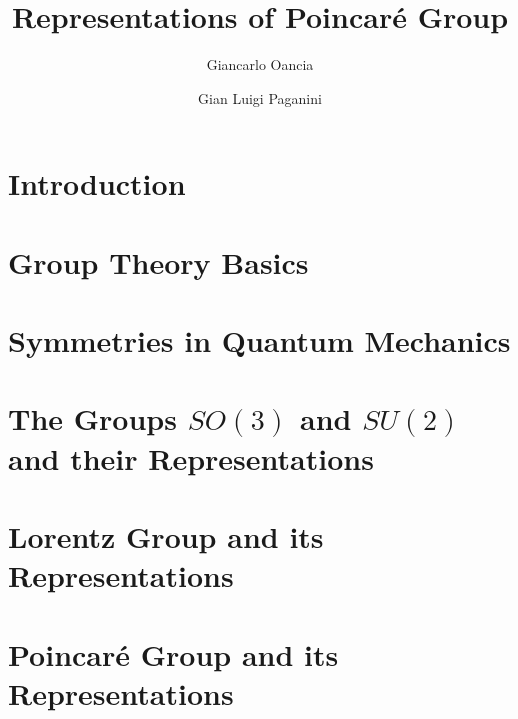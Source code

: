 \documentclass[a4paper,11pt]{report}
\title{Representations of Poincaré Group}
\author[a]{Giancarlo Oancia}
\author[a]{Gian Luigi Paganini}
\affiliation[a]{University of Bologna}
\begin{document}
\maketitle
\flushbottom
{}

\chapter{Introduction}


\chapter{Group Theory Basics}


\chapter{Symmetries in Quantum Mechanics}\label{sec:symmetries-qm}


\chapter{The Groups \texorpdfstring{$SO(3)$}{SO(3)} and \texorpdfstring{$SU(2)$}{SU(2)} and their Representations}


\chapter{Lorentz Group and its Representations}


\chapter{Poincaré Group and its Representations}





\appendix


\end{document}

